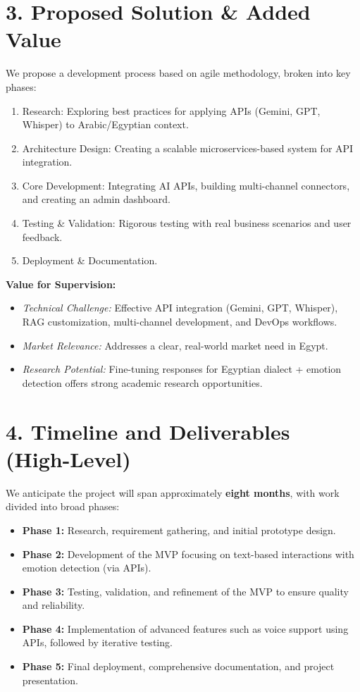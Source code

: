 \documentclass[12pt,a4paper]{article}
\begin{document}
\section*{3. Proposed Solution \& Added Value}

We propose a development process based on agile methodology, broken into key phases:
\begin{enumerate}[leftmargin=*]
    \item Research: Exploring best practices for applying APIs (Gemini, GPT, Whisper) to Arabic/Egyptian context.  
    \item Architecture Design: Creating a scalable microservices-based system for API integration.  
    \item Core Development: Integrating AI APIs, building multi-channel connectors, and creating an admin dashboard.  
    \item Testing \& Validation: Rigorous testing with real business scenarios and user feedback.  
    \item Deployment \& Documentation.  
\end{enumerate}

\textbf{Value for Supervision:}
\begin{itemize}[leftmargin=*]
    \item \textit{Technical Challenge:} Effective API integration (Gemini, GPT, Whisper), RAG customization, multi-channel development, and DevOps workflows.  
    \item \textit{Market Relevance:} Addresses a clear, real-world market need in Egypt.  
    \item \textit{Research Potential:} Fine-tuning responses for Egyptian dialect + emotion detection offers strong academic research opportunities.  
\end{itemize}

\section*{4. Timeline and Deliverables (High-Level)}
We anticipate the project will span approximately \textbf{eight months}, with work divided into broad phases: 
\begin{itemize}[leftmargin=*]
    \item \textbf{Phase 1:} Research, requirement gathering, and initial prototype design.  
    \item \textbf{Phase 2:} Development of the MVP focusing on text-based interactions with emotion detection (via APIs).  
    \item \textbf{Phase 3:} Testing, validation, and refinement of the MVP to ensure quality and reliability.  
    \item \textbf{Phase 4:} Implementation of advanced features such as voice support using APIs, followed by iterative testing.  
    \item \textbf{Phase 5:} Final deployment, comprehensive documentation, and project presentation.  
\end{itemize}
\end{document}
